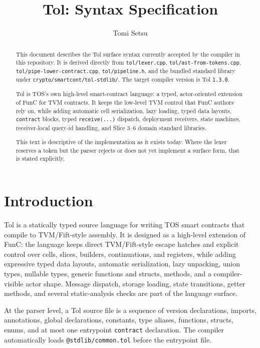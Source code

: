 \documentclass[12pt,oneside]{article}
\title{Tol: Syntax Specification}
\author{Tomi Setsu}
\begin{document}
\maketitle

\begin{abstract}
This document describes the Tol surface syntax currently accepted by the
compiler in this repository. It is derived directly from
\verb|tol/lexer.cpp|, \verb|tol/ast-from-tokens.cpp|,
\verb|tol/pipe-lower-contract.cpp|, \verb|tol/pipeline.h|, and the bundled
standard library under \verb|crypto/smartcont/tol-stdlib/|. The target compiler
version is Tol \verb|1.3.0|.

Tol is TOS's own high-level smart-contract language: a typed, actor-oriented
extension of FunC for TVM contracts. It keeps the low-level TVM control that
FunC authors rely on, while adding automatic cell serialization, lazy loading,
typed data layouts, \verb|contract| blocks, typed \verb|receive(...)| dispatch,
deployment receivers, state machines, receiver-local query-id handling, and
Slice 3--6 domain standard libraries.

This text is descriptive of the implementation as it exists today. Where the
lexer reserves a token but the parser rejects or does not yet implement a
surface form, that is stated explicitly.
\end{abstract}

\section*{Introduction}
Tol is a statically typed source language for writing TOS smart contracts that
compile to TVM/Fift-style assembly. It is designed as a high-level extension
of FunC: the language keeps direct TVM/Fift-style escape hatches and explicit
control over cells, slices, builders, continuations, and registers, while
adding expressive typed data layouts, automatic serialization, lazy unpacking,
union types, nullable types, generic functions and structs, methods, and a
compiler-visible actor shape. Message dispatch, storage loading, state
transitions, getter methods, and several static-analysis checks are part of
the language surface.

At the parser level, a Tol source file is a sequence of version declarations,
imports, annotations, global declarations, constants, type aliases, functions,
structs, enums, and at most one entrypoint \verb|contract| declaration. The
compiler automatically loads \verb|@stdlib/common.tol| before the entrypoint
file.
\end{document}
